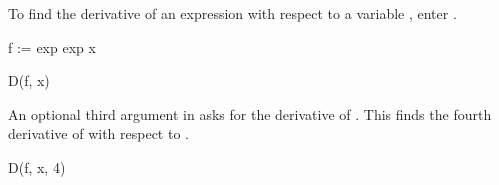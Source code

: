 {{{{{{{{\vskip 2pc
\begin{xtc}
\begin{xtccomment}
To find the derivative of an expression  with respect to a
variable , enter .
\end{xtccomment}
\begin{spadsrc}
f := exp exp x 
\end{spadsrc}
\begin{TeXOutput}
\begin{fricasmath}{1}
%
\end{fricasmath}
\end{TeXOutput}
\end{xtc}
\begin{xtc}
\begin{xtccomment}
\end{xtccomment}
\begin{spadsrc}
D(f, x) 
\end{spadsrc}
\begin{TeXOutput}
\begin{fricasmath}{2}
\TIMES {}%
\end{fricasmath}
\end{TeXOutput}
\end{xtc}
\begin{xtc}
\begin{xtccomment}
An optional third argument  in  asks
\Language{} for the  derivative of .
This finds the fourth derivative of  with respect to .
\end{xtccomment}
\begin{spadsrc}
D(f, x, 4) 
\end{spadsrc}
\begin{TeXOutput}
\begin{fricasmath}{3}
\TIMES {}%
\end{fricasmath}
\end{TeXOutput}
\end{xtc}
\begin{xtc}
\begin{xtccomment}

\end{xtccomment}
\end{xtc}}}}}}}}}
